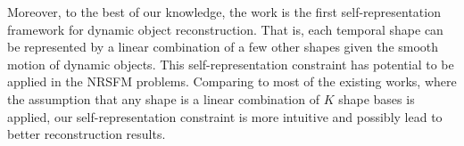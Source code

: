 Moreover, to the best of our knowledge, the work is the first self-representation framework for dynamic object reconstruction. That is, each temporal shape can be represented by a linear combination of a few other shapes given the smooth motion of dynamic objects. This self-representation constraint has potential to be applied in the NRSFM problems. Comparing to most of the existing works, where the assumption that any shape is a linear combination of $K$ shape bases is applied, our self-representation constraint is more intuitive and possibly lead to better reconstruction results.




















